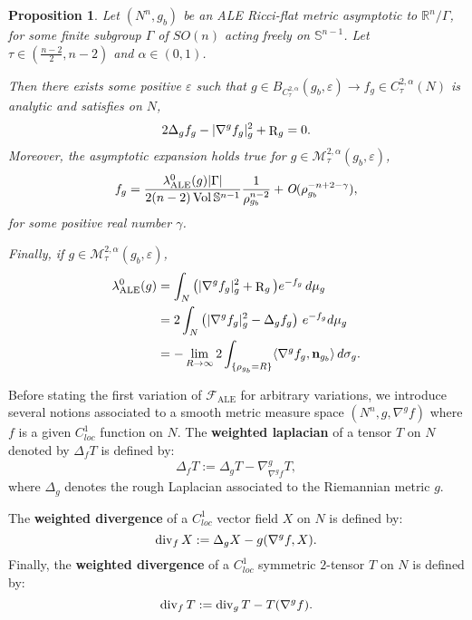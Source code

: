 \documentclass[a4paper,11pt,reqno]{amsart}
\newtheorem{prop}[defn]{Proposition}
\def\RR{\mathbb{R}}
\def\vol{\mathop{\rm vol}\nolimits}
\def\vol{\mathop{\rm Vol}\nolimits}
\def\div{\mathop{\rm div}\nolimits}
\def\vol{\mathop{\rm vol}\nolimits}
\def\vol{\mathop{\rm Vol}\nolimits}
\def\div{\mathop{\rm div}\nolimits}
\def\R{\mathop{\rm R}\nolimits}
\numberwithin{equation}{section}
\begin{document}
	\begin{prop}\label{prop-pot-fct}
		Let $(N^n,g_b)$ be an ALE Ricci-flat metric asymptotic to $\RR^n\slash\Gamma$, for some finite subgroup $\Gamma$ of $SO(n)$ acting freely on $\mathbb{S}^{n-1}$. Let $\tau\in(\frac{n-2}{2},n-2)$ and $\alpha\in(0,1)$. 
		
		Then there exists some positive $\varepsilon$ such that $g\in B_{C^{2,\alpha}_{\tau}}(g_b,\varepsilon)\rightarrow f_g\in C^{2,\alpha}_{\tau}(N)$ is analytic and satisfies on $N$,
		\begin{equation}
		2\Delta_gf_g-|\nabla^gf_g|^2_g+\R_g =0. \label{equ-criti-lambda-pot}
				\end{equation}
		Moreover, the asymptotic expansion holds true for $g\in\mathcal{M}^{2,\alpha}_{\tau}(g_b,\varepsilon)$,
		\begin{equation}
		f_g=\frac{\lambda_{\operatorname{ALE}}^0(g) |\Gamma|}{2(n-2)\vol{\mathbb{S}^{n-1}}}\frac{1}{\rho_{g_b}^{n-2}}+\textit{O}(\rho_{g_b}^{-n+2-\gamma}),
\end{equation}
for some positive real number $\gamma$.

		Finally, if $g\in\mathcal{M}^{2,\alpha}_{\tau}(g_b,\varepsilon)$,
		\begin{equation}
		\begin{split}
		\lambda_{\operatorname{ALE}}^0(g) &= \int_N \big(|\nabla^g f_g|_g^2 +\R_g  \big)e^{-f_g}\,d\mu_g\\
		& =2\int_N\left(|\nabla^gf_g|^2_g-\Delta_gf_g\right)\,e^{-f_g}d\mu_g\\
		&= -\lim_{R\to \infty} 2\int_{\{\rho_{g_b} = R\}} \langle\nabla^gf_g,\mathbf{n}_{g_b}\rangle\, d\sigma_g. \label{egalite-lambda-2-bis}
		\end{split}
		\end{equation}
	\end{prop}
	
	Before stating the first variation of $\mathcal{F}_{\operatorname{ALE}}$ for arbitrary variations, we introduce several notions associated to a smooth metric measure space $(N^n,g,\nabla^gf)$ where $f$ is a given $C^1_{loc}$ function on $N$. The \textbf{weighted laplacian} of a tensor $T$ on $N$ denoted by $\Delta_fT$ is defined by:
	\begin{equation}
	\Delta_fT:=\Delta_gT-\nabla^g_{\nabla^gf}T,
	\end{equation}
	where $\Delta_g$ denotes the rough Laplacian associated to the Riemannian metric $g$.
	
	The \textbf{weighted divergence} of a $C^1_{loc}$ vector field $X$ on $N$ is defined by:
	\begin{equation}
	\div_fX:=\Delta_gX-g(\nabla^gf,X).\label{def-wei-div-vec}
	\end{equation}
	Finally, the \textbf{weighted divergence} of a $C^1_{loc}$ symmetric $2$-tensor $T$ on $N$ is defined by:
	\begin{equation}
	\div_fT:=\div_gT-T(\nabla^gf).\label{def-wei-div-sym}
	\end{equation}
	
\end{document}
